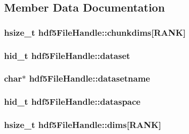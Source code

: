 \subsection{Member Data Documentation}
\hypertarget{structhdf5_file_handle_add4d9b7270f97f19abc571474abdd3e9}{
\subsubsection[{chunkdims}]{\setlength{\rightskip}{0pt plus 5cm}hsize\+\_\+t hdf5\+File\+Handle\+::chunkdims\mbox{[}{\bf R\+A\+N\+K}\mbox{]}}}\label{structhdf5_file_handle_add4d9b7270f97f19abc571474abdd3e9}
\hypertarget{structhdf5_file_handle_af77d7a91e4d8955453a7448c8946d8bc}{
\subsubsection[{dataset}]{\setlength{\rightskip}{0pt plus 5cm}hid\+\_\+t hdf5\+File\+Handle\+::dataset}}\label{structhdf5_file_handle_af77d7a91e4d8955453a7448c8946d8bc}
\hypertarget{structhdf5_file_handle_a597ef1d78a719e76d9f02ffb115d78d5}{
\subsubsection[{datasetname}]{\setlength{\rightskip}{0pt plus 5cm}char$\ast$ hdf5\+File\+Handle\+::datasetname}}\label{structhdf5_file_handle_a597ef1d78a719e76d9f02ffb115d78d5}
\hypertarget{structhdf5_file_handle_a9d7c01c66044c4e4a39019e918adcdd0}{
\subsubsection[{dataspace}]{\setlength{\rightskip}{0pt plus 5cm}hid\+\_\+t hdf5\+File\+Handle\+::dataspace}}\label{structhdf5_file_handle_a9d7c01c66044c4e4a39019e918adcdd0}
\hypertarget{structhdf5_file_handle_a09b1510d745e77343bd14981f379b3d2}{
\subsubsection[{dims}]{\setlength{\rightskip}{0pt plus 5cm}hsize\+\_\+t hdf5\+File\+Handle\+::dims\mbox{[}{\bf R\+A\+N\+K}\mbox{]}}}\label{structhdf5_file_handle_a09b1510d745e77343bd14981f379b3d2}
